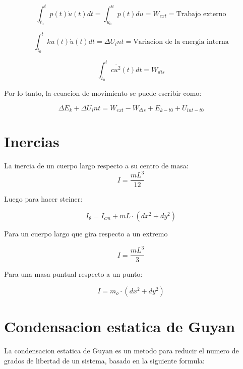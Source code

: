 \documentclass{article}  %
\begin{document}
\begin{equation}
    \int_{t_0}^{t} p(t) \dot{u}(t) dt = \int_{u_0}^{u} p(t) du = W_{ext} = \text{Trabajo externo}
\end{equation}

\begin{equation}
    \int_{t_0}^{t} k u(t) \dot{u}(t) dt = \Delta U_int = \text{Variacion de la energia interna}
\end{equation}

\begin{equation}
    \int_{t_0}^{t} c \dot{u^2}(t) dt = W_{dis}
\end{equation}

Por lo tanto, la ecuacion de movimiento se puede escribir como:

\begin{equation}
   \Delta E_k + \Delta U_int= W_{ext} - W_{dis} + {E_{k-t0} + U_{int-t0}} 
\end{equation}


\section{Inercias}

La inercia de un cuerpo largo respecto a su centro de masa:
\begin{equation}
    I = \frac{mL^3}{12}
\end{equation}

Luego para hacer steiner:

\begin{equation}
    I_{\theta} = I_{cm} + mL \cdot (dx^2 + dy^2)
\end{equation}

Para un cuerpo largo que gira respecto a un extremo

\begin{equation}
    I = \frac{mL^3}{3}
\end{equation}

Para una masa puntual respecto a un punto:

\begin{equation}
    I = m_o \cdot (dx^2 + dy^2)
\end{equation}

\section{Condensacion estatica de Guyan}

La condensacion estatica de Guyan es un metodo para reducir el numero de grados de libertad de un sistema, basado en la siguiente formula:
\end{document}
